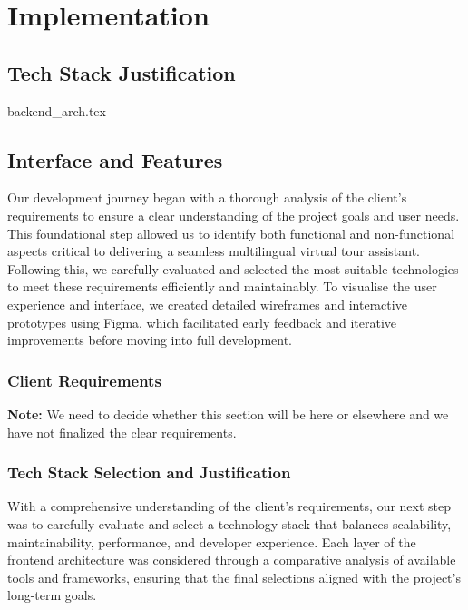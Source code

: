 \chapter{Implementation}
\section{Tech Stack Justification}
{backend_arch.tex}
\section{ Interface and Features}

Our development journey began with a thorough analysis of the client’s requirements to ensure a clear understanding of the project goals and user needs. This foundational step allowed us to identify both functional and non-functional aspects critical to delivering a seamless multilingual virtual tour assistant. Following this, we carefully evaluated and selected the most suitable technologies to meet these requirements efficiently and maintainably. To visualise the user experience and interface, we created detailed wireframes and interactive prototypes using Figma, which facilitated early feedback and iterative improvements before moving into full development.

\subsection{Client Requirements}

\textbf{Note:} We need to decide whether this section will be here or elsewhere and we have not finalized the clear requirements.

\subsection{Tech Stack Selection and Justification}

With a comprehensive understanding of the client's requirements, our next step was to carefully evaluate and select a technology stack that balances scalability, maintainability, performance, and developer experience. Each layer of the frontend architecture was considered through a comparative analysis of available tools and frameworks, ensuring that the final selections aligned with the project’s long-term goals.

